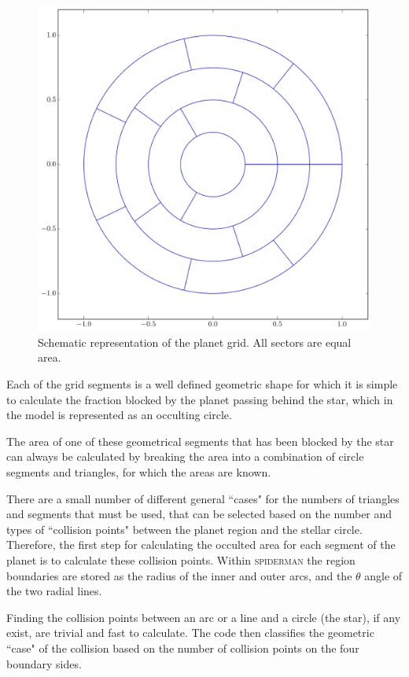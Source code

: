 \documentclass[a4paper,fleqn,usenatbib]{mnras}
\begin{document}
\begin{figure}
	\begin{center}
		\includegraphics[width=0.8\columnwidth]{img/frame1.pdf}
		\caption{Schematic representation of the planet grid. All sectors are equal area.}
		\label{fig:schematic}
	\end{center}
\end{figure}

Each of the grid segments is a well defined geometric shape for which it is simple to calculate the fraction blocked by the planet passing behind the star, which in the model is represented as an occulting circle.

The area of one of these geometrical segments that has been blocked by the star can always be calculated by breaking the area into a combination of circle segments and triangles, for which the areas are known.

There are a small number of different general ``cases" for the numbers of triangles and segments that must be used, that can be selected based on the number and types of ``collision points" between the planet region and the stellar circle. Therefore, the first step for calculating the occulted area for each segment of the planet is to calculate these collision points. Within \textsc{spiderman} the region boundaries are stored as the radius of the inner and outer arcs, and the $\theta$ angle of the two radial lines.

Finding the collision points between an arc or a line and a circle (the star), if any exist, are trivial and fast to calculate. The code then classifies the geometric ``case" of the collision based on the number of collision points on the four boundary sides.
\end{document}
